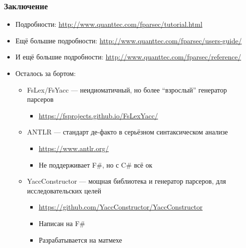 \documentclass[xetex,mathserif,serif]{beamer}
\begin{document}
    \begin{frame}
        \frametitle{Заключение}
        \begin{small}
            \begin{itemize}
                \item Подробности: \url{http://www.quanttec.com/fparsec/tutorial.html}
                \item Ещё большие подробности: \url{http://www.quanttec.com/fparsec/users-guide/}
                \item И ещё большие подробности: \url{http://www.quanttec.com/fparsec/reference/}
                \item Осталось за бортом:
                    \begin{itemize}
                        \item FsLex/FsYacc --- неидиоматичный, но более ``взрослый'' генератор парсеров
                            \begin{itemize}
                                \item \url{https://fsprojects.github.io/FsLexYacc/}
                            \end{itemize}
                        \item ANTLR --- стандарт де-факто в серьёзном синтаксическом анализе
                            \begin{itemize}
                                \item \url{https://www.antlr.org/}
                                \item Не поддерживает F\#, но с C\# всё ок
                            \end{itemize}
                        \item YaccConstructor --- мощная библиотека и генератор парсеров, для исследовательских целей
                            \begin{itemize}
                                \item \url{https://github.com/YaccConstructor/YaccConstructor}
                                \item Написан на F\#
                                \item Разрабатывается на матмехе
                            \end{itemize}
                    \end{itemize}
            \end{itemize}
        \end{small}
    \end{frame}
\end{document}
